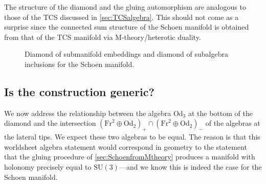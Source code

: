 \documentclass{pspum-l}
\newcommand*\Sc{\mathbb{S}}
\newcommand*\R{\mathbb{R}}
\theoremstyle{definition}
\theoremstyle{remark}
\numberwithin{equation}{section}
\begin{document}
The structure of the diamond and the gluing automorphism are analogous to those of the TCS discussed in \cref{sec:TCSalgebra}. This should not come as a surprise since the connected sum structure of the Schoen manifold is obtained from that of the TCS manifold via M-theory/heterotic duality.

\begin{figure}
\caption{Diamond of submanifold embeddings and diamond of subalgebra inclusions for the Schoen manifold.}
\label{fig:DiamondSchoen}
\end{figure}





\subsection{Is the construction generic?}

\label{sec:Schoengeneric}

We now address the relationship between the algebra $\text{Od}_3$ at the bottom of the diamond and the intersection $\left( \text{Fr}^2\oplus \text{Od}_2 \right)_+ \cap\left( \text{Fr}^2\oplus \text{Od}_2 \right)_-$ of the algebras at the lateral tips. We expect these two algebras to be equal. The reason is that this worldsheet algebra statement would correspond in geometry to the statement that the gluing procedure of \cref{sec:SchoenfromMtheory} produces a manifold with holonomy precisely equal to $\text{SU}(3)$---and we know this is indeed the case for the Schoen manifold.
\end{document}
